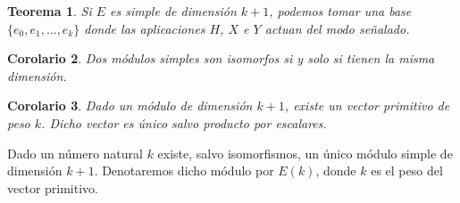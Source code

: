 \documentclass[a4paper,draft,12pt]{article}
\newtheorem{teo}{Teorema}[section]%
\newtheorem{cor}[teo]{Corolario}%
\begin{document}
\begin{teo}

Si $E$ es simple de dimensión $k+1$, podemos tomar una base $\{e_0,e_1,\dots, e_k\}$ donde las aplicaciones $H$, $X$ e $Y$ actuan del modo señalado.

\end{teo}

\begin{cor}

Dos módulos simples son isomorfos si y solo si tienen la misma dimensión.

\end{cor}

\begin{cor}

Dado un módulo de dimensión $k+1$, existe un vector primitivo de peso $k$.  Dicho vector es único salvo producto por escalares.

\end{cor}

Dado un número natural $k$ existe, salvo isomorfismos, un único módulo simple de dimensión $k+1$.  Denotaremos dicho módulo por $E(k)$, donde $k$ es el peso del vector primitivo.

\bigskip

\end{document}
